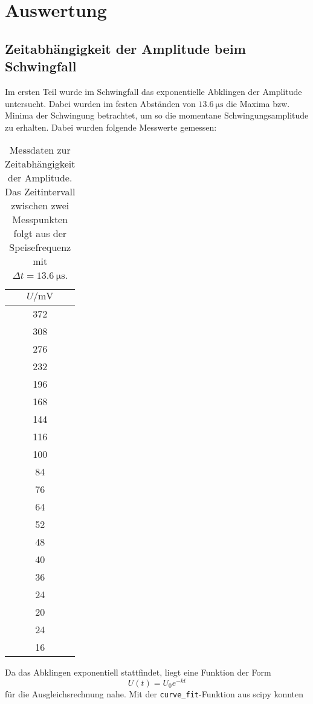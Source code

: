\section{Auswertung}
\label{sec:Auswertung}

\subsection{Zeitabhängigkeit der Amplitude beim Schwingfall}
\label{sec:Zeitabhängigkeit der Amplitude beim Schwingfall}
Im ersten Teil wurde im Schwingfall das exponentielle Abklingen der Amplitude untersucht. 
Dabei wurden im festen Abständen von $\SI{13.6}{\micro\second}$
die Maxima bzw. Minima der Schwingung betrachtet, um so die momentane Schwingungsamplitude
zu erhalten. Dabei wurden folgende Messwerte gemessen:
\begin{table}[H]
	\centering
	\caption{Messdaten zur Zeitabhängigkeit der Amplitude. Das Zeitintervall zwischen
		zwei Messpunkten folgt aus der Speisefrequenz mit $\Delta t =
	\SI{13.6}{\micro\second}$.}
	\label{tab:Messwerte-5a}
	\begin{tabular}{c}
		\toprule
		$U / \si{\milli\volt}$\\
		\midrule
		372	\\
		308	\\
		276	\\
		232	\\
		196	\\
		168	\\
		144	\\
		116	\\
		100	\\
		84 	\\
		76 	\\
		64 	\\
		52 	\\
		48 	\\
		40 	\\
		36 	\\
		24 	\\
		20 	\\
		24 	\\
		16 	\\
		\bottomrule
	\end{tabular}
\end{table}
\noindent
Da das Abklingen exponentiell stattfindet, liegt eine Funktion der Form
\begin{equation}
	U(t) = U_0 e^{-kt}
\end{equation}
für die Ausgleichsrechnung nahe. Mit der \texttt{curve\_fit}-Funktion aus scipy konnten
